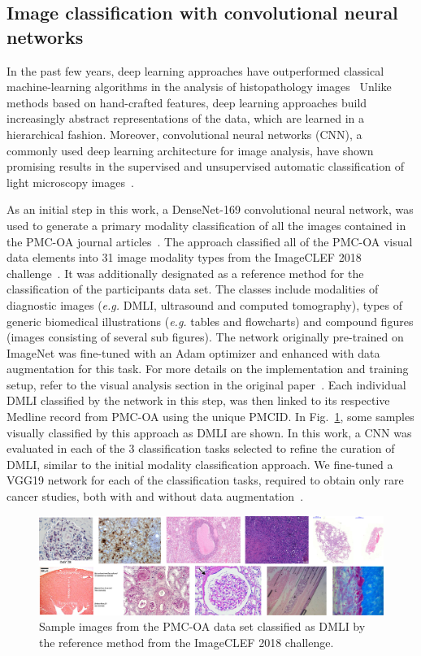 \documentclass[]{spie}  %
\begin{document}
\subsection{Image classification with convolutional neural networks}
%
In the past few years, deep learning approaches have outperformed classical machine-learning algorithms in the analysis of histopathology images~\cite{JOA2017}
Unlike methods based on hand-crafted features, deep learning approaches build increasingly abstract representations of the data, which are learned in a hierarchical fashion.
Moreover, convolutional neural networks (CNN), a commonly used deep learning architecture for image analysis, have shown promising results in the supervised and unsupervised automatic classification of light microscopy images~\cite{JAO2017}.

As an initial step in this work, a DenseNet-169 convolutional neural network, was used to generate a primary modality classification of all the images contained in the PMC-OA journal articles~\cite{HLW2017}.
The approach classified all of the PMC-OA visual data elements into 31 image modality types from the ImageCLEF 2018 challenge~\cite{IMV2018}.
It was additionally designated as a reference method for the classification of the participants data set.
The classes include modalities of diagnostic images (\emph{e.g.} DMLI, ultrasound and computed tomography), types of generic biomedical illustrations (\emph{e.g.} tables and flowcharts) and compound figures (images consisting of several sub figures). 
The network originally pre-trained on ImageNet was fine-tuned with an Adam optimizer and enhanced with data augmentation for this task. 
For more details on the implementation and training setup, refer to the visual analysis section in the original paper~\cite{AnM2018}.
Each individual DMLI classified by the network in this step, was then linked to its respective Medline record from PMC-OA using the unique PMCID.
In Fig.~\ref{fig:DMLI_samples}, some samples visually classified by this approach as DMLI are shown.
In this work, a CNN was evaluated in each of the 3 classification tasks selected to refine the curation of DMLI, similar to the initial modality classification approach.
We fine-tuned a VGG19 network for each of the classification tasks, required to obtain only rare cancer studies, both with and without data augmentation~\cite{SiZ2014}.
%
\begin{figure}
    \centering
    \includegraphics[width=\textwidth]{figures/samples.pdf}
    \caption{Sample images from the PMC-OA data set classified as DMLI by the reference method from the ImageCLEF 2018 challenge.}
    \label{fig:DMLI_samples}
\end{figure}
\vspace{5mm}
%
\end{document}
